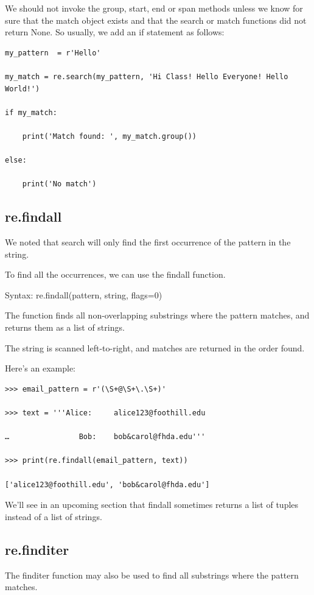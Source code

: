 \documentclass{article}
\begin{document}
We should not invoke the group, start, end or span methods unless we know for sure that the match object exists and that the search or match functions did not return None.  So usually, we add an if statement as follows:

\begin{lstlisting}
my_pattern  = r'Hello'

my_match = re.search(my_pattern, 'Hi Class! Hello Everyone! Hello World!')

if my_match:

    print('Match found: ', my_match.group())

else:

    print('No match')
\end{lstlisting}

\subsection{re.findall}
We noted that search will only find the first occurrence of the pattern in the string.  

To find all the occurrences, we can use the findall function.

Syntax:  re.findall(pattern, string, flags=0)

The function finds all non-overlapping substrings where the pattern matches, and returns them as a list of strings. 

The string is scanned left-to-right, and matches are returned in the order found.

Here's an example:

\begin{lstlisting}
>>> email_pattern = r'(\S+@\S+\.\S+)'

>>> text = '''Alice:     alice123@foothill.edu    

…                Bob:    bob&carol@fhda.edu'''

>>> print(re.findall(email_pattern, text))

['alice123@foothill.edu', 'bob&carol@fhda.edu']
\end{lstlisting}

We'll see in an upcoming section that findall sometimes returns a list of tuples instead of a list of strings.

\subsection{re.finditer}
The finditer function may also be used to find all substrings where the pattern matches. 
\end{document}
